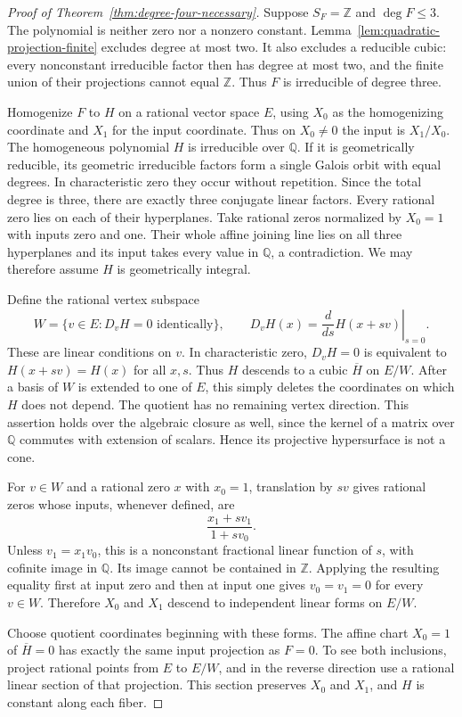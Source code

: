 \documentclass[11pt]{article}
\theoremstyle{definition}
\theoremstyle{remark}
\newcommand{\Q}{\mathbb Q}
\newcommand{\Z}{\mathbb Z}
\begin{document}
\begin{proof}[Proof of Theorem~\ref{thm:degree-four-necessary}]
Suppose $S_F=\Z$ and $\deg F\leq3$.  The polynomial is neither zero
nor a nonzero constant.  Lemma~\ref{lem:quadratic-projection-finite}
excludes degree at most two.  It also excludes a reducible cubic:
every nonconstant irreducible factor then has degree at most two,
and the finite union of their projections cannot equal $\Z$.
Thus $F$ is irreducible of degree three.

Homogenize $F$ to $H$ on a rational vector space $E$, using $X_0$ as
the homogenizing coordinate and $X_1$ for the input coordinate.
Thus on $X_0\ne0$ the input is $X_1/X_0$.
The homogeneous polynomial $H$ is irreducible over $\Q$.
If it is geometrically reducible, its geometric irreducible factors
form a single Galois orbit with equal degrees.  In characteristic
zero they occur without repetition.  Since the total degree is
three, there are exactly three conjugate linear factors.
Every rational zero lies on each of their hyperplanes.
Take rational zeros normalized by $X_0=1$ with inputs zero and one.
Their whole affine joining line lies on all three hyperplanes and
its input takes every value in $\Q$, a contradiction.
We may therefore assume $H$ is geometrically integral.

Define the rational vertex subspace
\[
 W=\{v\in E:D_vH=0\text{ identically}\},\qquad
 D_vH(x)=\left.\frac{d}{ds}H(x+sv)\right|_{s=0}.
\]
These are linear conditions on $v$.  In characteristic zero,
$D_vH=0$ is equivalent to $H(x+sv)=H(x)$ for all $x,s$.
Thus $H$ descends to a cubic $\overline H$ on $E/W$.
After a basis of $W$ is extended to one of $E$, this simply deletes
the coordinates on which $H$ does not depend.
The quotient has no remaining vertex direction.  This assertion
holds over the algebraic closure as well, since the kernel of a
matrix over $\Q$ commutes with extension of scalars.  Hence its
projective hypersurface is not a cone.

For $v\in W$ and a rational zero $x$ with $x_0=1$, translation by
$sv$ gives rational zeros whose inputs, whenever defined, are
\[
 \frac{x_1+s v_1}{1+s v_0}.
\]
Unless $v_1=x_1v_0$, this is a nonconstant fractional linear function
of $s$, with cofinite image in $\Q$.  Its image cannot be contained
in $\Z$.  Applying the resulting equality first at input zero and
then at input one gives $v_0=v_1=0$ for every $v\in W$.
Therefore $X_0$ and $X_1$ descend to independent linear forms on
$E/W$.

Choose quotient coordinates beginning with these forms.
The affine chart $X_0=1$ of $\overline H=0$ has exactly the same
input projection as $F=0$.  To see both inclusions, project rational
points from $E$ to $E/W$, and in the reverse direction use a rational
linear section of that projection.  This section preserves $X_0$
and $X_1$, and $H$ is constant along each fiber.


\end{proof}
\end{document}
